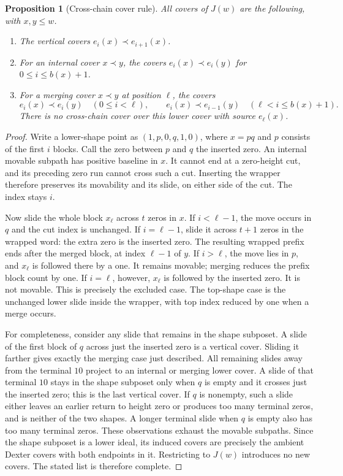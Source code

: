 \documentclass[11pt]{article}
\newtheorem{proposition}[theorem]{Proposition}
\theoremstyle{definition}
\begin{document}
\begin{proposition}[Cross-chain cover rule]\label{prop:covers}
All covers of $J(w)$ are the following, with $x,y\leq w$.
\begin{enumerate}
\item The vertical covers $e_i(x)\prec e_{i+1}(x)$.
\item For an internal cover $x\prec y$, the covers
$e_i(x)\prec e_i(y)$ for $0\leq i\leq b(x)+1$.
\item For a merging cover $x\prec y$ at position $\ell$, the covers
\[
 e_i(x)\prec e_i(y)\quad(0\leq i<\ell),\qquad
 e_i(x)\prec e_{i-1}(y)\quad(\ell<i\leq b(x)+1).
\]
There is no cross-chain cover over this lower cover with source
$e_\ell(x)$.
\end{enumerate}
\end{proposition}
\begin{proof}
Write a lower-shape point as $(1,p,0,q,1,0)$, where $x=pq$ and
$p$ consists of the first $i$ blocks. Call the zero between $p$ and
$q$ the inserted zero.
An internal movable subpath has positive baseline in $x$.
It cannot end at a zero-height cut, and its preceding zero run cannot
cross such a cut. Inserting the wrapper therefore preserves its
movability and its slide, on either side of the cut. The index stays $i$.

Now slide the whole block $x_\ell$ across $t$ zeros in $x$.
If $i<\ell-1$, the move occurs in $q$ and the cut index is unchanged.
If $i=\ell-1$, slide it across $t+1$ zeros in the wrapped word:
the extra zero is the inserted zero. The resulting wrapped prefix
ends after the merged block, at index $\ell-1$ of $y$.
If $i>\ell$, the move lies in $p$, and $x_\ell$ is followed there by
a one. It remains movable; merging reduces the prefix block count
by one. If $i=\ell$, however, $x_\ell$ is followed by the inserted
zero. It is not movable. This is precisely the excluded case.
The top-shape case is the unchanged lower slide inside the wrapper,
with top index reduced by one when a merge occurs.

For completeness, consider any slide that remains in the shape
subposet. A slide of the first block of $q$ across just the inserted
zero is a vertical cover. Sliding it farther gives exactly the
merging case just described. All remaining slides away from the
terminal $10$ project to an internal or merging lower cover.
A slide of that terminal $10$ stays in the shape subposet only when
$q$ is empty and it crosses just the inserted zero; this is the
last vertical cover. If $q$ is nonempty, such a slide either leaves
an earlier return to height zero or produces too many terminal zeros,
and is neither of the two shapes. A longer terminal slide when
$q$ is empty also has too many terminal zeros. These observations
exhaust the movable subpaths. Since the shape subposet is a lower
ideal, its induced covers are precisely the ambient Dexter covers
with both endpoints in it. Restricting to $J(w)$ introduces no new
covers. The stated list is therefore complete.
\end{proof}
\end{document}
